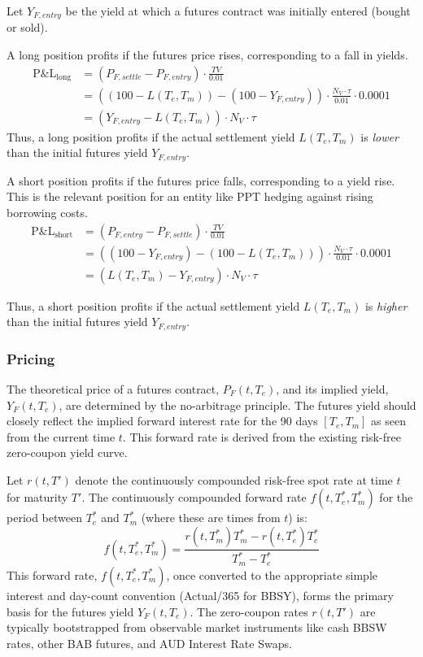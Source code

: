 \documentclass[11pt, a4paper, british]{article}
\begin{document}
Let $Y_{F, entry}$ be the yield at which a futures contract was initially entered (bought or sold).

A long position profits if the futures price rises, corresponding to a fall in yields.
\begin{align}
 \text{P\&L}_{\text{long}} &= (P_{F,settle} - P_{F,entry}) \cdot \frac{TV}{0.01} \\
 &= ((100 - L(T_e, T_m)) - (100 - Y_{F,entry})) \cdot \frac{N_V \cdot \tau}{0.01} \cdot 0.0001 \nonumber \\
 &= (Y_{F,entry} - L(T_e, T_m)) \cdot N_V \cdot \tau \label{eq:long_futures_pnl}
\end{align}
Thus, a long position profits if the actual settlement yield $L(T_e, T_m)$ is \textit{lower} than the initial futures yield $Y_{F, entry}$.

A short position profits if the futures price falls, corresponding to a yield rise. This is the relevant position for an entity like PPT hedging against rising borrowing costs.
\begin{align}
 \text{P\&L}_{\text{short}} &= (P_{F,entry} - P_{F,settle}) \cdot \frac{TV}{0.01} \\
 &= ((100 - Y_{F,entry}) - (100 - L(T_e, T_m))) \cdot \frac{N_V \cdot \tau}{0.01} \cdot 0.0001 \nonumber \\
 &= (L(T_e, T_m) - Y_{F,entry}) \cdot N_V \cdot \tau \label{eq:short_futures_pnl}
\end{align}

Thus, a short position profits if the actual settlement yield $L(T_e, T_m)$ is \textit{higher} than the initial futures yield $Y_{F, entry}$.

\subsubsection{Pricing}
The theoretical price of a futures contract, $P_F(t, T_e)$, and its implied yield, $Y_F(t, T_e)$, are determined by the no-arbitrage principle. The futures yield should closely reflect the implied forward interest rate for the 90 days $[T_e, T_m]$ as seen from the current time $t$. This forward rate is derived from the existing risk-free zero-coupon yield curve.

Let $r(t, T')$ denote the continuously compounded risk-free spot rate at time $t$ for maturity $T'$. The continuously compounded forward rate $f(t, T_e^*, T_m^*)$ for the period between $T_e^*$ and $T_m^*$ (where these are times from $t$) is:
\begin{equation} \label{eq:cont_forward_rate}
 f(t, T_e^*, T_m^*) = \frac{r(t, T_m^*)T_m^* - r(t, T_e^*)T_e^*}{T_m^* - T_e^*}
\end{equation}
This forward rate, $f(t, T_e^*, T_m^*)$, once converted to the appropriate simple interest and day-count convention (Actual/365 for BBSY), forms the primary basis for the futures yield $Y_F(t, T_e)$. The zero-coupon rates $r(t, T')$ are typically bootstrapped from observable market instruments like cash BBSW rates, other BAB futures, and AUD Interest Rate Swaps.
\end{document}
